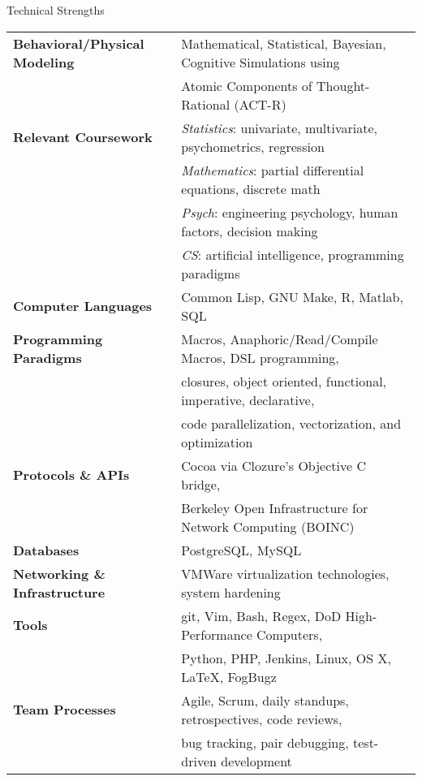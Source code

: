 

\begin{rSection}{Technical Strengths}
  \begin{tabular}{ @{} >{\bfseries}l @{\hspace{4ex}} l }
    Behavioral/Physical Modeling &	Mathematical, Statistical, Bayesian, Cognitive Simulations using \\
    &					Atomic Components of Thought-Rational (ACT-R) \\
    [.1cm]
    Relevant Coursework &		\emph{Statistics}: univariate, multivariate, psychometrics, regression \\
    &					\emph{Mathematics}: partial differential equations, discrete math \\
    &					\emph{Psych}: engineering psychology, human factors, decision making \\ 
    &					\emph{CS}: artificial intelligence, programming paradigms \\
    [.1cm]
    Computer Languages &		Common Lisp, GNU Make, R, Matlab, SQL \\
    [.1cm]
    Programming Paradigms &		Macros, Anaphoric/Read/Compile Macros, DSL programming, \\
    & 					closures, object oriented, functional, imperative, declarative, \\
    &					code parallelization, vectorization, and optimization \\
    [.1cm]
    Protocols \& APIs & 		Cocoa via Clozure's Objective C bridge, \\
    &					Berkeley Open Infrastructure for Network Computing (BOINC) \\
    [.1cm]
    Databases &				PostgreSQL, MySQL \\
    [.1cm]
    Networking \& Infrastructure &	VMWare virtualization technologies, system hardening \\
    [.1cm]
    Tools & 				git, Vim, Bash, Regex, DoD High-Performance Computers, \\
    &					Python, PHP, Jenkins, Linux, OS X, \LaTeX, FogBugz \\
    [.1cm]
    Team Processes & 			Agile, Scrum, daily standups, retrospectives, code reviews, \\
    & 					bug tracking, pair debugging, test-driven development \\
  \end{tabular}
\end{rSection}

